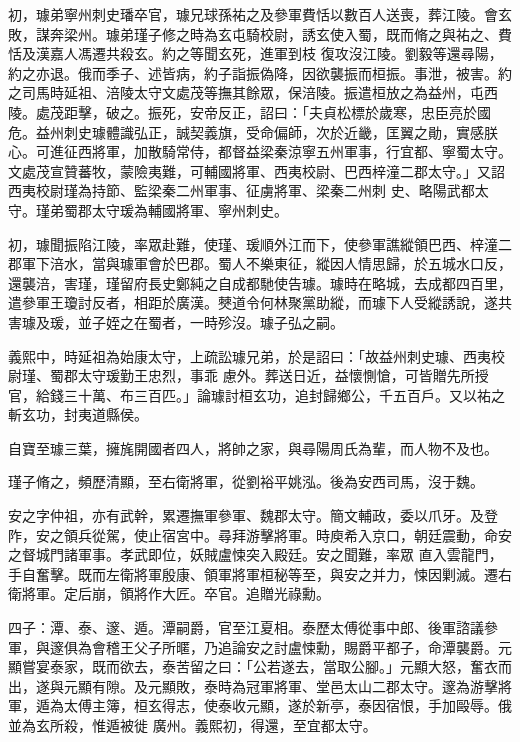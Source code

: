 \begin{pinyinscope}
 初，璩弟寧州刺史璠卒官，璩兄球孫祐之及參軍費恬以數百人送喪，葬江陵。會玄敗，謀奔梁州。璩弟瑾子修之時為玄屯騎校尉，誘玄使入蜀，既而脩之與祐之、費恬及漢嘉人馮遷共殺玄。約之等聞玄死，進軍到枝
 復攻沒江陵。劉毅等還尋陽，約之亦退。俄而季子、述皆病，約子詣振偽降，因欲襲振而桓振。事泄，被害。約之司馬時延祖、涪陵太守文處茂等撫其餘眾，保涪陵。振遣桓放之為益州，屯西陵。處茂距擊，破之。振死，安帝反正，詔曰：「夫貞松標於歲寒，忠臣亮於國危。益州刺史璩體識弘正，誠契義旗，受命偏師，次於近畿，匡翼之勛，實感朕心。可進征西將軍，加散騎常侍，都督益梁秦涼寧五州軍事，行宜都、寧蜀太守。文處茂宣贊蕃牧，蒙險夷難，可輔國將軍、西夷校尉、巴西梓潼二郡太守。」又詔西夷校尉瑾為持節、監梁秦二州軍事、征虜將軍、梁秦二州刺
 史、略陽武都太守。瑾弟蜀郡太守瑗為輔國將軍、寧州刺史。



 初，璩聞振陷江陵，率眾赴難，使瑾、瑗順外江而下，使參軍譙縱領巴西、梓潼二郡軍下涪水，當與璩軍會於巴郡。蜀人不樂東征，縱因人情思歸，於五城水口反，還襲涪，害瑾，瑾留府長史鄭純之自成都馳使告璩。璩時在略城，去成都四百里，遣參軍王瓊討反者，相距於廣漢。僰道令何林聚黨助縱，而璩下人受縱誘說，遂共害璩及瑗，並子姪之在蜀者，一時殄沒。璩子弘之嗣。



 義熙中，時延祖為始康太守，上疏訟璩兄弟，於是詔曰：「故益州刺史璩、西夷校尉瑾、蜀郡太守瑗勤王忠烈，事乖
 慮外。葬送日近，益懷惻愴，可皆贈先所授官，給錢三十萬、布三百匹。」論璩討桓玄功，追封歸鄉公，千五百戶。又以祐之斬玄功，封夷道縣侯。



 自寶至璩三葉，擁旄開國者四人，將帥之家，與尋陽周氏為輩，而人物不及也。



 瑾子脩之，頻歷清顯，至右衛將軍，從劉裕平姚泓。後為安西司馬，沒于魏。



 安之字仲祖，亦有武幹，累遷撫軍參軍、魏郡太守。簡文輔政，委以爪牙。及登阼，安之領兵從駕，使止宿宮中。尋拜游擊將軍。時庾希入京口，朝廷震動，命安之督城門諸軍事。孝武即位，妖賊盧悚突入殿廷。安之聞難，率眾
 直入雲龍門，手自奮擊。既而左衛將軍殷康、領軍將軍桓秘等至，與安之并力，悚因剿滅。遷右衛將軍。定后崩，領將作大匠。卒官。追贈光祿勳。



 四子：潭、泰、邃、遁。潭嗣爵，官至江夏相。泰歷太傅從事中郎、後軍諮議參軍，與邃俱為會稽王父子所暱，乃追論安之討盧悚勳，賜爵平都子，命潭襲爵。元顯嘗宴泰家，既而欲去，泰苦留之曰：「公若遂去，當取公腳。」元顯大怒，奮衣而出，遂與元顯有隙。及元顯敗，泰時為冠軍將軍、堂邑太山二郡太守。邃為游擊將軍，遁為太傅主簿，桓玄得志，使泰收元顯，遂於新亭，泰因宿恨，手加毆辱。俄並為玄所殺，惟遁被徙
 廣州。義熙初，得還，至宜都太守。




\end{pinyinscope}
